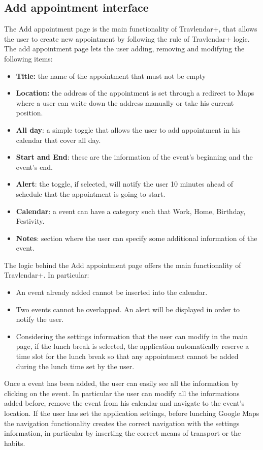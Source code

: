 \subsection*{Add appointment interface}
The Add appointment page is the main functionality of Travlendar+, that allows the user to create new appointment by following the rule of Travlendar+ logic. 
The add appointment page lets the user adding, removing and modifying the following items:
\begin{itemize}
\item \textbf{Title:} the name of the appointment that must not be empty
\item \textbf{Location:} the address of the appointment is set through a redirect to Maps where a user can write down the address manually or take his current position. 
\item \textbf{All day}: a simple toggle that allows the user to add appointment in his calendar that cover all day.
\item \textbf{Start and End}: these are the information of the event's beginning and the event's end.
\item \textbf{Alert}: the toggle, if selected, will notify the user 10 minutes ahead of schedule that the appointment is going to start.
\item \textbf{Calendar}: a event can have a category such that Work, Home, Birthday, Festivity.
\item \textbf{Notes}: section where the user can specify some additional information of the event.
\end{itemize}

The logic behind the Add appointment page offers the main functionality of Travlendar+. In particular:
\begin{itemize}
\item An event already added cannot be inserted into the calendar.
\item Two events cannot be overlapped. An alert will be displayed in order to notify the user.
\item Considering the settings information that the user can modify in the main page, if the lunch break is selected, the application automatically reserve a time slot for the lunch break so that any appointment cannot be added during the lunch time set by the user.
\end{itemize}

Once a event has been added, the user can easily see all the information by clicking on the event. In particular the user can modify all the informations added before, remove the event from his calendar and navigate to the event's location. If the user has set the application settings, before lunching Google Maps the navigation functionality creates the correct navigation with the settings information, in particular by inserting the correct means of transport or the habits.

